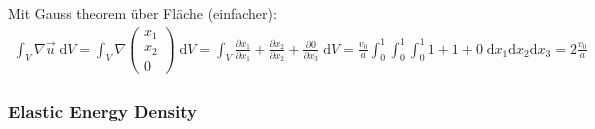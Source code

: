 	Mit Gauss theorem über Fläche (einfacher):
	\begin{align}
		\int_V \nabla \vec u \; \mathrm dV = \int_V \nabla \begin{pmatrix}
			x_1\\ x_2\\ 0
		\end{pmatrix} \; \mathrm dV = \int_{V}
		\frac{\partial x_1}{\partial x_1} + \frac{\partial x_2}{\partial x_2} +
		\frac{\partial 0}{\partial x_3} \; \mathrm dV =
		\frac{v_0}{a}
		\int_{0}^{1}
		\int_{0}^{1}
		\int_{0}^{1} 1 + 1 + 0 \; \mathrm dx_1 \mathrm dx_2 \mathrm dx_3 = 2
		\frac{v_0}{a}
	\end{align}

\subsubsection{Elastic Energy Density} %


